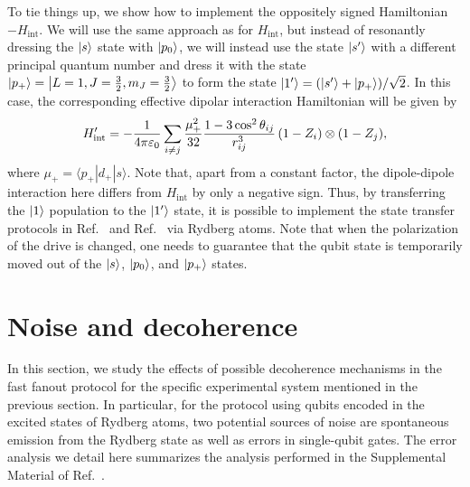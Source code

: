 To tie things up, we show how to implement the oppositely signed Hamiltonian $-H_\mathrm{int}$.
We will use the same approach as for $H_\mathrm{int}$, but instead of resonantly dressing the $\left | s \right\rangle$ state with $\left | p_0 \right\rangle$, we will instead use the state $\left | s' \right\rangle$ with a different principal quantum number and dress it
with the state $\left | p_+ \right\rangle = \left | L=1,J=\frac32,m_J=\frac32 \right\rangle$ %
to form the state $\left | 1' \right\rangle = (\left | s' \right\rangle + \left | p_+ \right\rangle)/\sqrt{2}$.
In this case, the corresponding effective dipolar interaction Hamiltonian will be given by
\begin{align}
\label{eq:neg-dipole-Ham}
  H_\mathrm{int}'= -\frac{1}{4\pi\varepsilon_0}\sum_{i\neq j} \frac{\mu_+^2}{32} \frac{1-3\cos^2\theta_{ij}}{r_{ij}^3}\, (1-Z_i)\otimes (1-Z_j),
\end{align}
where $\mu_+ = \langle p_+|d_+|s\rangle$.
Note that, apart from a constant factor, the dipole-dipole interaction here differs from $H_\mathrm{int}$ by only a negative sign.
Thus, by
transferring the $\left | 1 \right\rangle$ population to the $\left | 1' \right\rangle$ state, it is possible to implement the state transfer protocols in Ref.~\cite{Eldredge2017} and Ref.~\cite{Tran2021a} via Rydberg atoms.
Note that when the polarization of the drive is changed, one needs to guarantee that the qubit state is temporarily moved out of the $\left | s \right\rangle$, $\left | p_0 \right\rangle$, and $\left | p_+ \right\rangle$ states.


\section{Noise and decoherence}
\label{sec:IV}
In this section, we study the effects of possible decoherence mechanisms in the fast fanout protocol for the specific experimental system mentioned in the previous section.
In particular, for the protocol using qubits encoded in the excited states of Rydberg atoms, two potential sources of noise are spontaneous emission from the Rydberg state as well as errors in single-qubit gates.
The error analysis we detail here summarizes the analysis performed in the Supplemental Material of Ref.~\cite{Eldredge2017}.
